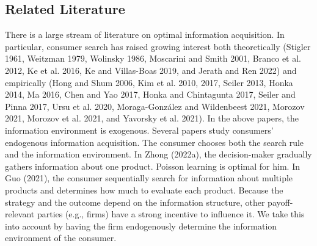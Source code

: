 \documentclass[11pt]{extarticle}
\begin{document}
\subsection{Related Literature}
There is a large stream of literature on optimal information acquisition. In particular, consumer search has raised growing interest both theoretically (Stigler 1961, Weitzman 1979, Wolinsky 1986, Moscarini and Smith 2001, Branco et al. 2012, Ke et al. 2016, Ke and Villas-Boas 2019, and Jerath and Ren 2022) and empirically (Hong and Shum 2006, Kim et al. 2010, 2017, Seiler 2013, Honka 2014, Ma 2016, Chen and Yao 2017, Honka and Chintagunta 2017, Seiler and Pinna 2017, Ursu et al. 2020, Moraga-González and Wildenbeest 2021, Morozov 2021, Morozov et al. 2021, and Yavorsky et al. 2021). In the above papers, the information environment is exogenous. Several papers study consumers' endogenous information acquisition. The consumer chooses both the search rule and the information environment. In Zhong (2022a), the decision-maker gradually gathers information about one product. Poisson learning is optimal for him. In Guo (2021), the consumer sequentially search for information about multiple products and determines how much to evaluate each product. 
Because the strategy and the outcome depend on the information structure, other payoff-relevant parties (e.g., firms) have a strong incentive to influence it. We take this into account by having the firm endogenously determine the information environment of the consumer.  
\end{document}

